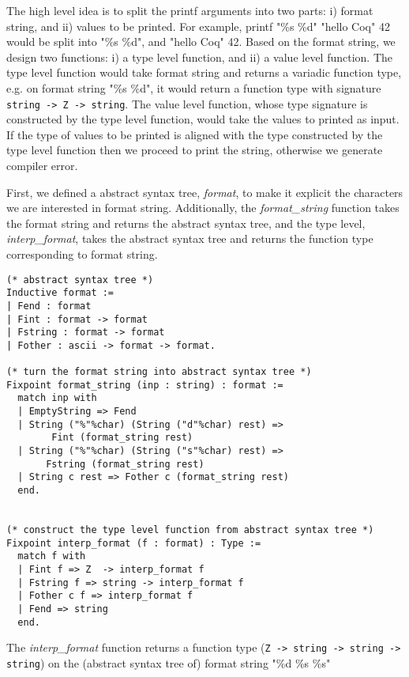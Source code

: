  The high level idea is to split the printf arguments into two parts: i) format string, 
 and ii) values to be printed. For example, printf "\%s \%d" "hello Coq" 42 would be split into "\%s \%d", and 
 "hello Coq" 42.  Based on the format string, we design two functions: i) a type level function, 
 and ii) a value level function. The type level function would 
 take format string and returns a variadic function type, e.g. 
 on format string "\%s \%d", it would return a function type with 
 signature \texttt{string -> Z  -> string}.
 The value level function, whose type signature 
 is constructed by the type level function, would take the values to printed as input. If the 
 type of values to be printed is aligned with the type constructed by the type level function then 
 we proceed to print the string, otherwise we generate compiler error.  
 


First, we defined a abstract syntax tree, \textit{format}, to make it explicit the characters we 
are interested in format string. Additionally, the \textit{format\_string} function takes the format string 
and returns the abstract syntax tree, and the type level, \textit{interp\_format}, takes the 
abstract syntax tree and returns the function type corresponding to format string.

\begin{verbatim}
(* abstract syntax tree *)
Inductive format :=
| Fend : format
| Fint : format -> format
| Fstring : format -> format
| Fother : ascii -> format -> format.

(* turn the format string into abstract syntax tree *)
Fixpoint format_string (inp : string) : format :=
  match inp with
  | EmptyString => Fend
  | String ("%"%char) (String ("d"%char) rest) => 
        Fint (format_string rest)
  | String ("%"%char) (String ("s"%char) rest) => 
       Fstring (format_string rest)
  | String c rest => Fother c (format_string rest)
  end.


(* construct the type level function from abstract syntax tree *)
Fixpoint interp_format (f : format) : Type :=
  match f with
  | Fint f => Z  -> interp_format f
  | Fstring f => string -> interp_format f
  | Fother c f => interp_format f
  | Fend => string
  end.
\end{verbatim}


\noindent
The \textit{interp\_format} function returns a function type 
(\texttt{Z -> string -> string -> string})  on the (abstract syntax tree of) 
format string "\%d \%s \%s" 

